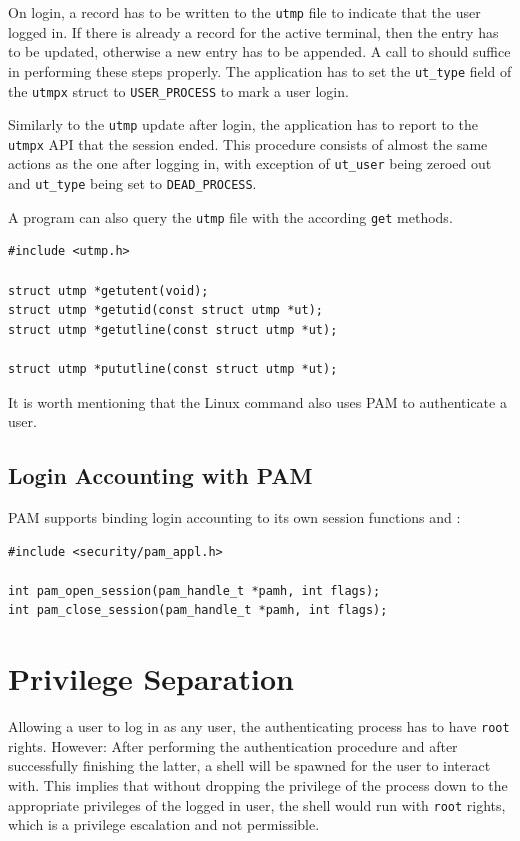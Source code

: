 \documentclass[10pt,a4paper,titlepage,twoside,english,final]{zhawreprt}
\begin{document}
On \gls{login}, a record has to be written to the \texttt{utmp} file to indicate that the user logged in.
If there is already a record for the active \gls{terminal}, then the entry has to be updated, otherwise a new entry has to be appended.
A call to \cite{pututxline} should suffice in performing these steps properly.
The application has to set the \texttt{ut\_type} field of the \texttt{utmpx} struct to \texttt{USER\_PROCESS} to mark a user \gls{login}.

Similarly to the \texttt{utmp} update after \gls{login}, the application has to report to the \texttt{utmpx} \gls{API} that the session ended.
This procedure consists of almost the same actions as the one after logging in, with exception of \texttt{ut\_user} being zeroed out and \texttt{ut\_type} being set to \texttt{DEAD\_PROCESS}\citep[p.828]{KerriskTLPI}.

A program can also query the \texttt{utmp} file with the according \texttt{get} methods.
\setlistingC
\begin{lstlisting}[caption={\texttt{utmpx} \gls{API} functions},label=lst:UtmpxApiFunctions]
#include <utmp.h>

struct utmp *getutent(void);
struct utmp *getutid(const struct utmp *ut);
struct utmp *getutline(const struct utmp *ut);

struct utmp *pututline(const struct utmp *ut);
\end{lstlisting}

It is worth mentioning that the \gls{Linux} command \cite{login} also uses PAM to authenticate a user.

\subsection{Login Accounting with PAM}\label{ssec:DesignLoginAccountingWithPAM}
\gls{PAM} supports binding \gls{login} accounting to its own session functions \cite{pam_open_session} and \cite{pam_close_session}:
\setlistingC
\begin{lstlisting}[caption={\gls{PAM} session management},label=lst:PAMSessionManagement]
#include <security/pam_appl.h>

int pam_open_session(pam_handle_t *pamh, int flags);
int pam_close_session(pam_handle_t *pamh, int flags);
\end{lstlisting}


\newpage



\newpage
\section{Privilege Separation}\label{sec:DesignPrivilegeSeparation}
Allowing a user to log in as any user, the authenticating process has to have \texttt{root} rights.
However: After performing the authentication procedure and after successfully finishing the latter, a \gls{shell} will be spawned for the user to interact with.
This implies that without dropping the privilege of the process down to the appropriate privileges of the logged in user, the \gls{shell} would run with \texttt{root} rights, which is a privilege escalation and not permissible.
\end{document}
